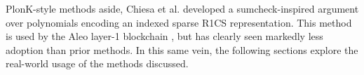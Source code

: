 \noindent PlonK-style methods aside, Chiesa et al. \cite{marlin} developed a sumcheck-inspired argument over polynomials encoding an indexed sparse R1CS representation. This method is used by the Aleo layer-1 blockchain \cite{aleo}, but has clearly seen markedly less adoption than prior methods. In this same vein, the following sections explore the real-world usage of the methods discussed.  
